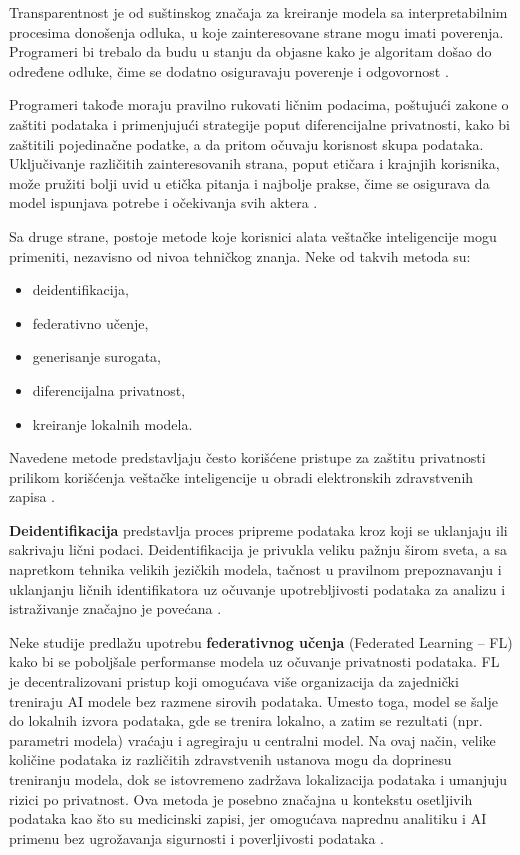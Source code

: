 \documentclass[a4paper,12pt]{article}
\begin{document}
Transparentnost je od suštinskog značaja za kreiranje modela sa interpretabilnim procesima donošenja odluka, u koje zainteresovane strane mogu imati poverenja. Programeri bi trebalo da budu u stanju da objasne kako je algoritam došao do određene odluke, čime se dodatno osiguravaju poverenje i odgovornost \cite{radanliev2023ethicsresponsibleaideployment}.

Programeri takođe moraju pravilno rukovati ličnim podacima, poštujući zakone o zaštiti podataka i primenjujući strategije poput diferencijalne privatnosti, kako bi zaštitili pojedinačne podatke, a da pritom očuvaju korisnost skupa podataka. Uključivanje različitih zainteresovanih strana, poput etičara i krajnjih korisnika, može pružiti bolji uvid u etička pitanja i najbolje prakse, čime se osigurava da model ispunjava potrebe i očekivanja svih aktera \cite{radanliev2023ethicsresponsibleaideployment}.

Sa druge strane, postoje metode koje korisnici alata veštačke inteligencije mogu primeniti, nezavisno od nivoa tehničkog znanja. Neke od takvih metoda su:

\begin{itemize}
\item deidentifikacija,
\item federativno učenje,
\item generisanje surogata,
\item diferencijalna privatnost,
\item kreiranje lokalnih modela.
\end{itemize}

Navedene metode predstavljaju često korišćene pristupe za zaštitu privatnosti prilikom korišćenja veštačke inteligencije u obradi elektronskih zdravstvenih zapisa \cite{nature_privacy_llm}.

\textbf{Deidentifikacija} predstavlja proces pripreme podataka kroz koji se uklanjaju ili sakrivaju lični podaci. Deidentifikacija je privukla veliku pažnju širom sveta, a sa napretkom tehnika velikih jezičkih modela, tačnost u pravilnom prepoznavanju i uklanjanju ličnih identifikatora uz očuvanje upotrebljivosti podataka za analizu i istraživanje značajno je povećana \cite{nature_privacy_llm}.

Neke studije predlažu upotrebu \textbf{federativnog učenja} (Federated Learning – FL) kako bi se poboljšale performanse modela uz očuvanje privatnosti podataka. FL je decentralizovani pristup koji omogućava više organizacija da zajednički treniraju AI modele bez razmene sirovih podataka. Umesto toga, model se šalje do lokalnih izvora podataka, gde se trenira lokalno, a zatim se rezultati (npr. parametri modela) vraćaju i agregiraju u centralni model. Na ovaj način, velike količine podataka iz različitih zdravstvenih ustanova mogu da doprinesu treniranju modela, dok se istovremeno zadržava lokalizacija podataka i umanjuju rizici po privatnost. Ova metoda je posebno značajna u kontekstu osetljivih podataka kao što su medicinski zapisi, jer omogućava naprednu analitiku i AI primenu bez ugrožavanja sigurnosti i poverljivosti podataka \cite{nature_privacy_llm}.
\end{document}
